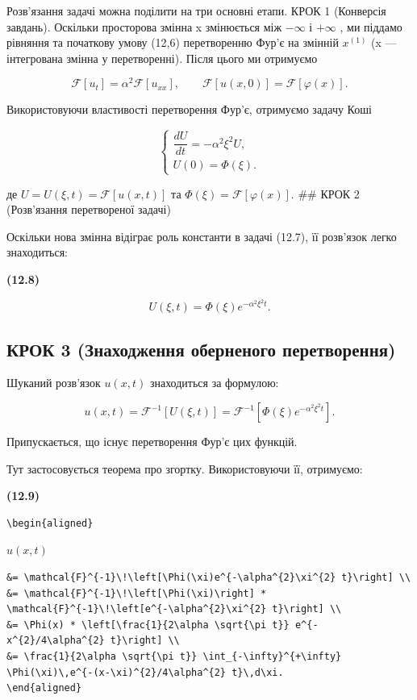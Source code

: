 \documentclass[
  ukrainian,
]{article}
\begin{document}
Розв'язання задачі можна поділити на три основні етапи. КРОК 1
(Конверсія завдань). Оскільки просторова змінна x змінюється між
\(-\infty\) і \(+\infty\) , ми піддамо рівняння та початкову умову
(12,6) перетворенню Фур'є на змінній \(x^{(1)}\) (x --- інтегрована
змінна у перетворенні). Після цього ми отримуємо

\[
\mathcal{F}[u_t] = \alpha^2 \mathcal{F}[u_{xx}],\qquad
\mathcal{F}[u(x,0)] = \mathcal{F}[\varphi(x)].
\]

Використовуючи властивості перетворення Фур'є, отримуємо задачу Коші

\[
\begin{cases}
\dfrac{dU}{dt}=-\alpha^2\xi^2U,\\
U(0)=\Phi(\xi).
\end{cases}
\]

де \(U=U(\xi,t)=\mathcal{F}[u(x,t)]\) та
\(\Phi(\xi)=\mathcal{F}[\varphi(x)]\). \#\# КРОК 2 (Розв'язання
перетвореної задачі)

Оскільки нова змінна відіграє роль константи в задачі (12.7), її
розв'язок легко знаходиться:

\textbf{(12.8)}

\[
U(\xi,t)=\Phi(\xi)e^{-\alpha^2\xi^2 t}.
\]

\subsection{КРОК 3 (Знаходження оберненого
перетворення)}\label{ux43aux440ux43eux43a-3-ux437ux43dux430ux445ux43eux434ux436ux435ux43dux43dux44f-ux43eux431ux435ux440ux43dux435ux43dux43eux433ux43e-ux43fux435ux440ux435ux442ux432ux43eux440ux435ux43dux43dux44f}

Шуканий розв'язок \(u(x,t)\) знаходиться за формулою:

\[
u(x, t) = \mathcal{F}^{-1}\!\left[U(\xi, t)\right]
= \mathcal{F}^{-1}\!\left[\Phi(\xi)e^{-\alpha^2 \xi^2 t}\right].
\]

Припускається, що існує перетворення Фур'є цих функцій.

Тут застосовується теорема про згортку. Використовуючи її, отримуємо:

\textbf{(12.9)}

\begin{verbatim}
\begin{aligned}
\end{verbatim}

\(u(x, t)\)

\begin{verbatim}
&= \mathcal{F}^{-1}\!\left[\Phi(\xi)e^{-\alpha^{2}\xi^{2} t}\right] \\
&= \mathcal{F}^{-1}\!\left[\Phi(\xi)\right] * \mathcal{F}^{-1}\!\left[e^{-\alpha^{2}\xi^{2} t}\right] \\
&= \Phi(x) * \left[\frac{1}{2\alpha \sqrt{\pi t}} e^{-x^{2}/4\alpha^{2} t}\right] \\
&= \frac{1}{2\alpha \sqrt{\pi t}} \int_{-\infty}^{+\infty} \Phi(\xi)\,e^{-(x-\xi)^{2}/4\alpha^{2} t}\,d\xi.
\end{aligned}
\end{verbatim}
\end{document}
